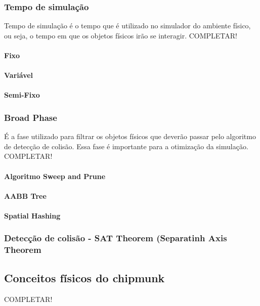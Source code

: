 \subsubsection{Tempo de simulação}

Tempo de simulação é o tempo que é utilizado no simulador do ambiente físico, ou seja, o tempo em que os objetos físicos irão se interagir.
COMPLETAR!
\paragraph{Fixo}
\paragraph{Variável}
\paragraph{Semi-Fixo}

\subsubsection{Broad Phase}
É a fase utilizado para filtrar os objetos físicos que deverão passar pelo algoritmo de detecção de colisão. Essa fase é importante para a otimização da simulação.
COMPLETAR!

\paragraph{Algoritmo Sweep and Prune}
\paragraph{AABB Tree}
\paragraph{Spatial Hashing}

\subsubsection{Detecção de colisão - SAT Theorem (Separatinh Axis Theorem}
\subsection{Conceitos físicos do chipmunk}
COMPLETAR!
